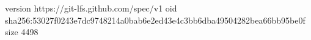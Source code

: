 version https://git-lfs.github.com/spec/v1
oid sha256:53027f0243e7dc9748214a0bab6e2ed43e4c3bb6dba49504282bea66bb95be0f
size 4498
